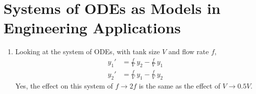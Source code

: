 \section{Systems of ODEs as Models in Engineering Applications}
\begin{enumerate}
    \item Looking at the system of ODEs, with tank size $ V $ and flow rate $ f $,
          \begin{align}
              y_1' & = \frac{f}{V}\ y_2 - \frac{f}{V}\ y_1 \\
              y_2' & = \frac{f}{V}\ y_1 - \frac{f}{V}\ y_2
          \end{align}
          {\color{y_h} Yes}, the effect on this system of $ f \rightarrow 2f $ is
          the same as the effect of $ V \rightarrow 0.5V $.


\end{enumerate}
